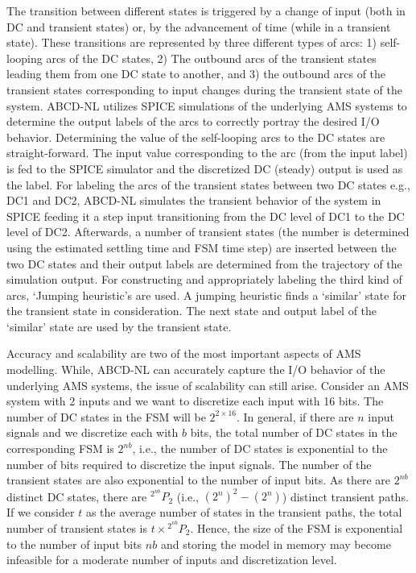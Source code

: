 \documentclass[a4paper]{article}
\newcommand*{\Perm}[2]{{}^{#1}\!P_{#2}}%
\begin{document}
The transition between different states is triggered by a change of input (both in DC and transient states) or, by the advancement of time (while in a transient state). These transitions are represented by three different types of arcs: 1) self-looping arcs of the DC states, 2) The outbound arcs of the transient states leading them from one DC state to another, and 3) the outbound arcs of the transient states corresponding to input changes during the transient state of the system. ABCD-NL utilizes SPICE simulations of the underlying AMS systems to determine the output labels of the arcs to correctly portray the desired I/O behavior.  Determining the value of the self-looping arcs to the DC states are straight-forward. The input value corresponding to the arc (from the input label) is fed to the SPICE simulator and the discretized DC (steady) output is used as the label. For labeling the arcs of the transient states between two DC states e.g., DC1 and DC2, ABCD-NL simulates the transient behavior of the system in SPICE feeding it a step input transitioning from the DC level of DC1 to the DC level of DC2. Afterwards, a number of transient states (the number is determined using the estimated settling time and FSM time step) are inserted between the two DC states and their output labels are determined from the trajectory of the simulation output. For constructing and appropriately labeling the third kind of arcs, `Jumping heuristic's are used. A jumping heuristic finds a `similar' state for the transient state in consideration. The next state and output label of the `similar' state are used by the transient state. 


Accuracy and scalability are two of the most important aspects of AMS modelling. While, ABCD-NL can accurately capture the I/O behavior of the underlying AMS systems, the issue of  scalability can still arise. Consider an AMS system with 2 inputs and we want to discretize each input with 16 bits. The number of DC states in the FSM will be $2^{2 \times 16}$. In general, if there are $n$ input signals and we discretize each with $b$ bits, the total number of DC states in the corresponding FSM is $2^{nb}$, i.e., the number of DC states is exponential to the number of bits required to discretize the input signals. The number of the transient states are also exponential to the number of input bits. As there are $2^{nb}$ distinct DC states, there are $\Perm{2^{nb}}{2}$ (i.e., $ (2^n)^2 - (2^n) $) distinct transient paths. If we consider $t$ as the average number of states in the transient paths, the total number of transient states is $ t \times \Perm{2^{nb}}{2} $. Hence, the size of the FSM is exponential to the number of input bits $nb$ and storing the model in memory may become infeasible for a moderate number of inputs and discretization level. 
\end{document}

